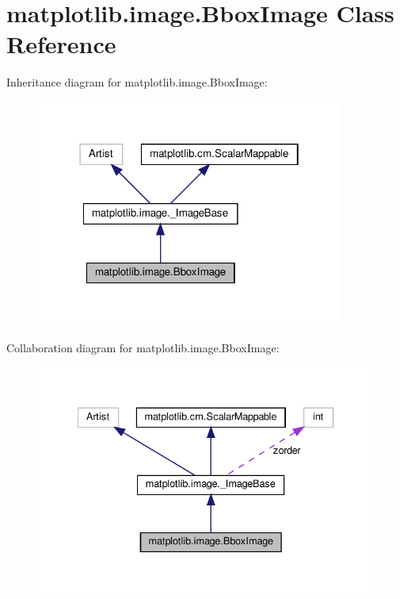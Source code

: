 \hypertarget{classmatplotlib_1_1image_1_1BboxImage}{}\section{matplotlib.\+image.\+Bbox\+Image Class Reference}
\label{classmatplotlib_1_1image_1_1BboxImage}


Inheritance diagram for matplotlib.\+image.\+Bbox\+Image\+:
\nopagebreak
\begin{figure}[H]
\begin{center}
\leavevmode
\includegraphics[width=286pt]{classmatplotlib_1_1image_1_1BboxImage__inherit__graph}
\end{center}
\end{figure}


Collaboration diagram for matplotlib.\+image.\+Bbox\+Image\+:
\nopagebreak
\begin{figure}[H]
\begin{center}
\leavevmode
\includegraphics[width=334pt]{classmatplotlib_1_1image_1_1BboxImage__coll__graph}
\end{center}
\end{figure}
